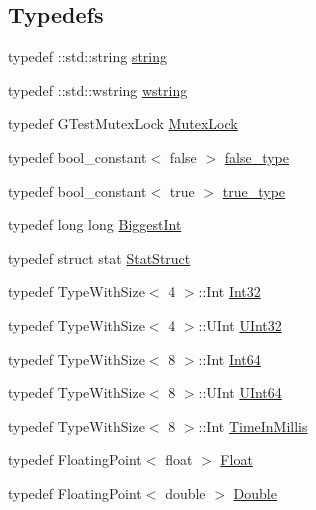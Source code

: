 \subsection*{\-Typedefs}
\begin{DoxyCompactItemize}
\item 
typedef \-::std\-::string \hyperlink{namespacetesting_1_1internal_a9882e571372fc19a02d2b2949e1f1557}{string}
\item 
typedef \-::std\-::wstring \hyperlink{namespacetesting_1_1internal_a393885eea6349a55ca3640cccbe912a6}{wstring}
\item 
typedef \-G\-Test\-Mutex\-Lock \hyperlink{namespacetesting_1_1internal_a0ceb93bd27638edfa3ced2469951fd99}{\-Mutex\-Lock}
\item 
typedef bool\-\_\-constant$<$ false $>$ \hyperlink{namespacetesting_1_1internal_a6fd572a03d56d5b60cf459268a055e4c}{false\-\_\-type}
\item 
typedef bool\-\_\-constant$<$ true $>$ \hyperlink{namespacetesting_1_1internal_a6f18ab9cf27798886d6a0f222dc004bc}{true\-\_\-type}
\item 
typedef long long \hyperlink{namespacetesting_1_1internal_ae8f73370150f905887720532fa9f572e}{\-Biggest\-Int}
\item 
typedef struct stat \hyperlink{namespacetesting_1_1internal_1_1posix_a28f577553e4511ddefedf8c62dda12cd}{\-Stat\-Struct}
\item 
typedef \-Type\-With\-Size$<$ 4 $>$\-::\-Int \hyperlink{namespacetesting_1_1internal_a8d84339888eecdb29b3d8f7607af3ecc}{\-Int32}
\item 
typedef \-Type\-With\-Size$<$ 4 $>$\-::\-U\-Int \hyperlink{namespacetesting_1_1internal_a03df445d5850459574de6ffb6f57ae95}{\-U\-Int32}
\item 
typedef \-Type\-With\-Size$<$ 8 $>$\-::\-Int \hyperlink{namespacetesting_1_1internal_af808a02f2629fbe7daf70b8bded220f6}{\-Int64}
\item 
typedef \-Type\-With\-Size$<$ 8 $>$\-::\-U\-Int \hyperlink{namespacetesting_1_1internal_ad44e156098a845911b5d4788b9512930}{\-U\-Int64}
\item 
typedef \-Type\-With\-Size$<$ 8 $>$\-::\-Int \hyperlink{namespacetesting_1_1internal_a9e0fb32f592d143f031a3431366adae0}{\-Time\-In\-Millis}
\item 
typedef \-Floating\-Point$<$ float $>$ \hyperlink{namespacetesting_1_1internal_ac9c0c59007cb41f8937e5adbef20b1e8}{\-Float}
\item 
typedef \-Floating\-Point$<$ double $>$ \hyperlink{namespacetesting_1_1internal_a6c60ea293c4bfb29b9e7d03ac89202c1}{\-Double}

\end{DoxyCompactItemize}
